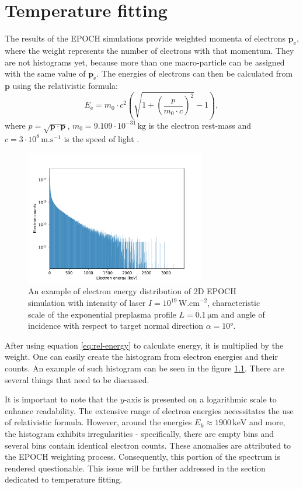 \chapter{Temperature fitting}
The results of the EPOCH simulations provide weighted momenta of electrons $\bm{p}_\mathrm{e}$, where the weight represents the number of electrons with that momentum. They are not histograms yet, because more than one macro-particle can be assigned with the same value of $\bm{p}_\mathrm{e}$. The energies of electrons can then be calculated from $\bm{p}$ using the relativistic formula:
\begin{equation}
	\label{eq:rel-energy}
	E_\mathrm{e} = m_0\cdot c^2\left(\sqrt{1+\left(\frac{p}{m_0\cdot c}\right)^2} -1\right)\mathrm{,}
\end{equation}
where $p=\sqrt{\bm{p}\cdot\bm{p}}$, $m_0 =  9.109 \cdot 10^{-31} \, \mathrm{kg}$ is the electron rest-mass and $c=3\cdot 10^{8} \, \mathrm{m . s}^{-1}$ is the speed of light \cite{constants}.

\begin{figure}[h]
	\centering
	\includegraphics[width=0.7\textwidth]{figures/example-histogram}
	\caption{An example of electron energy distribution of 2D EPOCH simulation with intensity of laser $I=10^{19}\,\mathrm{W.cm}^{-2}$, characteristic scale of the exponential preplasma profile $L=0.1\,\mathrm{\mu m}$ and angle of incidence with respect to target normal direction $\alpha = 10$°.}
	\label{fig:example-histogram}
\end{figure}
After using equation \ref{eq:rel-energy} to calculate energy, it is multiplied by the weight. One can easily create the histogram from electron energies and their counts. An example of such histogram can be seen in the figure \ref{fig:example-histogram}. There are several things that need to be discussed.

It is important to note that the $y$-axis is presented on a logarithmic scale to enhance readability. The extensive range of electron energies necessitates the use of relativistic formula. However, around the energies $E_k \approx 1900 \, \mathrm{keV}$ and more, the histogram exhibits irregularities - specifically, there are empty bins and several bins contain identical electron counts. These anomalies are attributed to the EPOCH weighting process. Consequently, this portion of the spectrum is rendered questionable. This issue will be further addressed in the section dedicated to temperature fitting.

